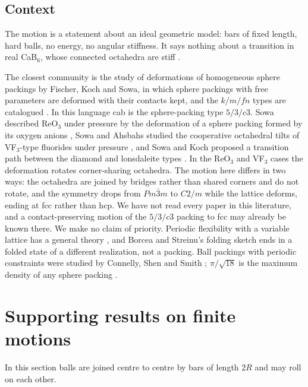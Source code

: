 \documentclass[11pt]{amsart}
\theoremstyle{definition}
\theoremstyle{remark}
\begin{document}
\subsection{Context}
The motion is a statement about an ideal geometric model: bars of fixed length, hard balls, no energy, no angular stiffness. It says nothing about a transition in real CaB$_6$, whose connected octahedra are stiff \cite{LiRefsonDove2023}.

The closest community is the study of deformations of homogeneous sphere packings by Fischer, Koch and Sowa, in which sphere packings with free parameters are deformed with their contacts kept, and the $k/m/fn$ types are catalogued \cite{ITCSpherePackings,Fischer2004,KochFischerSowa2006}. In this language \textsf{cab} is the sphere-packing type $5/3/c3$. Sowa described ReO$_3$ under pressure by the deformation of a sphere packing formed by its oxygen anions \cite{Sowa1988}, Sowa and Ahsbahs studied the cooperative octahedral tilts of VF$_3$-type fluorides under pressure \cite{SowaAhsbahs1998}, and Sowa and Koch proposed a transition path between the diamond and lonsdaleite types \cite{SowaKoch2001}. In the ReO$_3$ and VF$_3$ cases the deformation rotates corner-sharing octahedra. The motion here differs in two ways: the octahedra are joined by bridges rather than shared corners and do not rotate, and the symmetry drops from $Pm\bar3m$ to $C2/m$ while the lattice deforms, ending at fcc rather than hcp. We have not read every paper in this literature, and a contact-preserving motion of the $5/3/c3$ packing to fcc may already be known there. We make no claim of priority. Periodic flexibility with a variable lattice has a general theory \cite{BorceaStreinu2010,MalesteinTheran2013}, and Borcea and Streinu's folding sketch \cite[Section~7]{BorceaStreinu2021} ends in a folded state of a different realization, not a packing. Ball packings with periodic constraints were studied by Connelly, Shen and Smith \cite{ConnellyShenSmith2014}; $\pi/\sqrt{18}$ is the maximum density of any sphere packing \cite{Hales2005}.

\section{Supporting results on finite motions}\label{sec:supporting}

In this section balls are joined centre to centre by bars of length $2R$ and may roll on each other.
\end{document}
